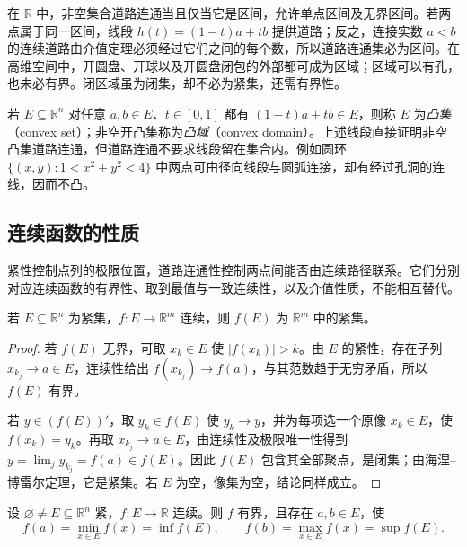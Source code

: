 \documentclass[UTF8,12pt,a4paper,fontset=fandol]{ctexbook}
\begin{document}
在 $\mathbb R$ 中，非空集合道路连通当且仅当它是区间，允许单点区间及无界区间。若两点属于同一区间，线段 $h(t)=(1-t)a+tb$ 提供道路；反之，连接实数 $a<b$ 的连续道路由介值定理必须经过它们之间的每个数，所以道路连通集必为区间。在高维空间中，开圆盘、开球以及开圆盘闭包的外部都可成为区域；区域可以有孔，也未必有界。闭区域虽为闭集，却不必为紧集，还需有界性。

若 $E\subseteq\mathbb R^n$ 对任意 $a,b\in E$、$t\in[0,1]$ 都有 $(1-t)a+tb\in E$，则称 $E$ 为\emph{凸集}（convex set）；非空开凸集称为\emph{凸域}（convex domain）。上述线段直接证明非空凸集道路连通，但道路连通不要求线段留在集合内。例如圆环 $\{(x,y):1<x^2+y^2<4\}$ 中两点可由径向线段与圆弧连接，却有经过孔洞的连线，因而不凸。

\subsection{连续函数的性质}
\label{subsec:properties-of-continuous-multivariable-functions}

紧性控制点列的极限位置，道路连通性控制两点间能否由连续路径联系。它们分别对应连续函数的有界性、取到最值与一致连续性，以及介值性质，不能相互替代。

\begin{theorem}[连续像保持紧性]
\label{thm:continuous-image-of-euclidean-compact-set}
若 $E\subseteq\mathbb R^n$ 为紧集，$f:E\to\mathbb R^m$ 连续，则 $f(E)$ 为 $\mathbb R^m$ 中的紧集。
\end{theorem}

\begin{proof}
若 $f(E)$ 无界，可取 $x_k\in E$ 使 $|f(x_k)|>k$。由 $E$ 的紧性，存在子列 $x_{k_j}\to a\in E$，连续性给出 $f(x_{k_j})\to f(a)$，与其范数趋于无穷矛盾，所以 $f(E)$ 有界。

若 $y\in(f(E))'$，取 $y_k\in f(E)$ 使 $y_k\to y$，并为每项选一个原像 $x_k\in E$，使 $f(x_k)=y_k$。再取 $x_{k_j}\to a\in E$，由连续性及极限唯一性得到 $y=\lim_jy_{k_j}=f(a)\in f(E)$。因此 $f(E)$ 包含其全部聚点，是闭集；由海涅--博雷尔定理，它是紧集。若 $E$ 为空，像集为空，结论同样成立。
\end{proof}

\begin{corollary}[有界性与最值定理]
\label{cor:multivariable-extreme-value-theorem}
设 $\varnothing\neq E\subseteq\mathbb R^n$ 紧，$f:E\to\mathbb R$ 连续。则 $f$ 有界，且存在 $a,b\in E$，使
\[
    f(a)=\min_{x\in E}f(x)=\inf f(E),\qquad
    f(b)=\max_{x\in E}f(x)=\sup f(E).
\]
\end{corollary}
\end{document}
